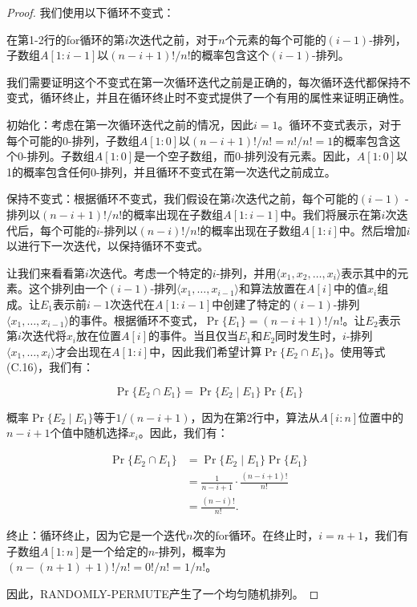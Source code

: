 \documentclass[lang=cn,newtx,10pt,scheme=chinese]{elegantbook}
\begin{document}
\begin{proof}
我们使用以下循环不变式：

在第1-2行的for循环的第$i$次迭代之前，对于$n$个元素的每个可能的$(i-1)$-排列，子数组$A[1:i-1]$以$(n-i+1)!/n!$的概率包含这个$(i-1)$-排列。

我们需要证明这个不变式在第一次循环迭代之前是正确的，每次循环迭代都保持不变式，循环终止，并且在循环终止时不变式提供了一个有用的属性来证明正确性。

初始化：考虑在第一次循环迭代之前的情况，因此$i=1$。循环不变式表示，对于每个可能的0-排列，子数组$A[1:0]$以$(n-i+1)!/n!=n!/n!=1$的概率包含这个0-排列。子数组$A[1:0]$是一个空子数组，而0-排列没有元素。因此，$A[1:0]$以1的概率包含任何0-排列，并且循环不变式在第一次迭代之前成立。

保持不变式：根据循环不变式，我们假设在第$i$次迭代之前，每个可能的$(i-1)$ -排列以$(n-i+1)!/n!$的概率出现在子数组$A[1:i-1]$中。我们将展示在第$i$次迭代后，每个可能的$i$-排列以$(n-i)!/n!$的概率出现在子数组$A[1:i]$中。然后增加$i$以进行下一次迭代，以保持循环不变式。

让我们来看看第$i$次迭代。考虑一个特定的$i$-排列，并用$\langle x_1,x_2,\ldots,x_i\rangle$表示其中的元素。这个排列由一个$(i-1)$-排列$\langle x_1,\ldots,x_{i-1}\rangle$和算法放置在$A[i]$中的值$x_i$组成。让$E_1$表示前$i-1$次迭代在$A[1:i-1]$中创建了特定的$(i-1)$-排列$\langle x_1,\ldots,x_{i-1}\rangle$的事件。根据循环不变式，$\operatorname{Pr}\{E_1\}=(n-i+1)!/n!$。让$E_2$表示第$i$次迭代将$x_i$放在位置$A[i]$的事件。当且仅当$E_1$和$E_2$同时发生时，$i$-排列$\langle x_1,\ldots,x_i\rangle$才会出现在$A[1:i]$中，因此我们希望计算$\operatorname{Pr}\{E_2 \cap E_1\}$。使用等式(C.16)，我们有：

$$
\operatorname{Pr}\{E_2 \cap E_1\}=\operatorname{Pr}\{E_2 \mid E_1\} \operatorname{Pr}\{E_1\}
$$

概率$\operatorname{Pr}\{E_2 \mid E_1\}$等于$1/(n-i+1)$，因为在第2行中，算法从$A[i:n]$位置中的$n-i+1$个值中随机选择$x_i$。因此，我们有：

$$
\begin{aligned}
\operatorname{Pr}\{E_2 \cap E_1\} & =\operatorname{Pr}\{E_2 \mid E_1\} \operatorname{Pr}\{E_1\} \\
& =\frac{1}{n-i+1} \cdot \frac{(n-i+1) !}{n !} \\
& =\frac{(n-i) !}{n !} .
\end{aligned}
$$

终止：循环终止，因为它是一个迭代$n$次的for循环。在终止时，$i=n+1$，我们有子数组$A[1:n]$是一个给定的$n$-排列，概率为$(n-(n+1)+1)!/n!=0!/n!=1/n!$。

因此，RANDOMLY-PERMUTE产生了一个均匀随机排列。
\end{proof}
\end{document}
